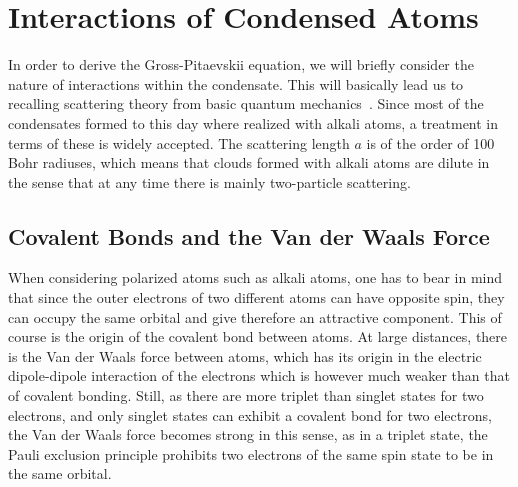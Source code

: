\section{Interactions of Condensed Atoms}
In order to derive the Gross-Pitaevskii equation, we will briefly consider the nature of interactions within the condensate. This will basically lead us to 
recalling scattering theory from basic quantum mechanics~\cite{schwabl}. Since most of the condensates formed to this day where realized with alkali atoms, a 
treatment in terms of these is widely accepted. The scattering length $a$ is of the order of 100 Bohr radiuses, which means that clouds formed with alkali atoms 
are dilute in the sense that at any time there is mainly two-particle scattering.

\subsection{Covalent Bonds and the Van der Waals Force}
When considering polarized atoms such as alkali atoms, one has to bear in mind that 
since the outer electrons of two different atoms can have opposite spin, they can occupy the same 
orbital and give therefore an attractive component. This of course is the origin of the covalent bond between atoms.
At large distances, there is the Van der Waals force between atoms, which has its origin in the electric dipole-dipole interaction
of the electrons which is however much weaker than that of covalent bonding. Still, as there are more triplet than singlet states for two electrons, and only singlet 
states can exhibit a covalent bond for two electrons, the Van der Waals force becomes strong in this sense, as in a triplet state, the Pauli exclusion principle 
prohibits two electrons of the same spin state to be in the same orbital.
 

